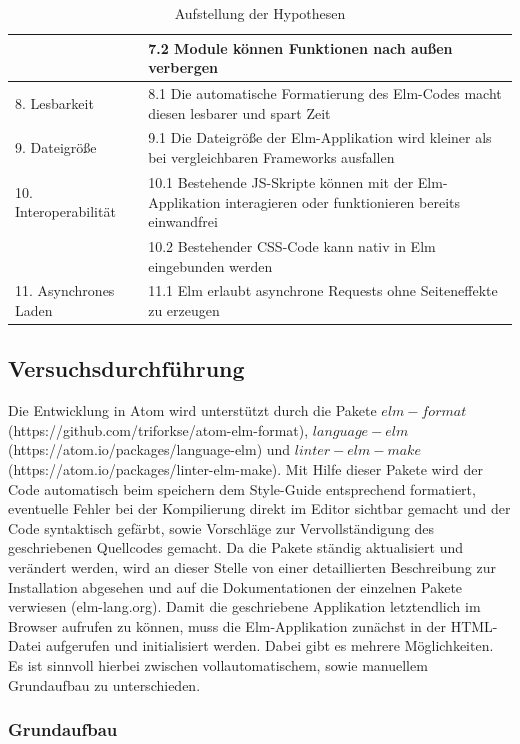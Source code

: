\begin{table}[p]
\begin{tabular}{ | l | p{7.6cm} | }
	& 7.2 Module können Funktionen nach außen verbergen\\
	\hline
	8. Lesbarkeit &  8.1 Die automatische Formatierung des Elm-Codes macht diesen lesbarer und spart Zeit\\	
	\hline
	9. Dateigröße &  9.1 Die Dateigröße der Elm-Applikation wird kleiner als bei vergleichbaren Frameworks ausfallen\\
	\hline
	10. Interoperabilität &  10.1 Bestehende \ac{JS}-Skripte können mit der Elm-Applikation interagieren oder funktionieren bereits einwandfrei\\
	& 10.2 Bestehender \ac{CSS}-Code kann nativ in Elm eingebunden werden\\
	\hline
	11. Asynchrones Laden &  11.1 Elm erlaubt asynchrone Requests ohne Seiteneffekte zu erzeugen\\
	\hline
\end{tabular}
\caption{Aufstellung der Hypothesen}\label{tab:Hypothesentabelle}
\end{table}

\subsection{Versuchsdurchführung}
\label{sec:Versuchsdurchführung}
Die Entwicklung in Atom wird unterstützt durch die Pakete $elm-format$\\ (https://github.com/triforkse/atom-elm-format), $language-elm$\\ (https://atom.io/packages/language-elm) und {$linter-elm-make$}\\ (https://atom.io/packages/linter-elm-make). Mit Hilfe dieser Pakete wird der Code automatisch beim speichern dem Style-Guide entsprechend formatiert, eventuelle Fehler bei der Kompilierung direkt im Editor sichtbar gemacht und der Code syntaktisch gefärbt, sowie Vorschläge zur Vervollständigung des geschriebenen Quellcodes gemacht. Da die Pakete ständig aktualisiert und verändert werden, wird an dieser Stelle von einer detaillierten Beschreibung zur Installation abgesehen und auf die Dokumentationen der einzelnen Pakete verwiesen (elm-lang.org).
Damit die geschriebene Applikation letztendlich im Browser aufrufen zu können, muss die Elm-Applikation zunächst in der \ac{HTML}-Datei aufgerufen und initialisiert werden. Dabei gibt es mehrere Möglichkeiten. Es ist sinnvoll hierbei zwischen vollautomatischem, sowie manuellem Grundaufbau zu unterschieden.
\subsubsection{Grundaufbau}
\label{sec:Grundaufbau}

